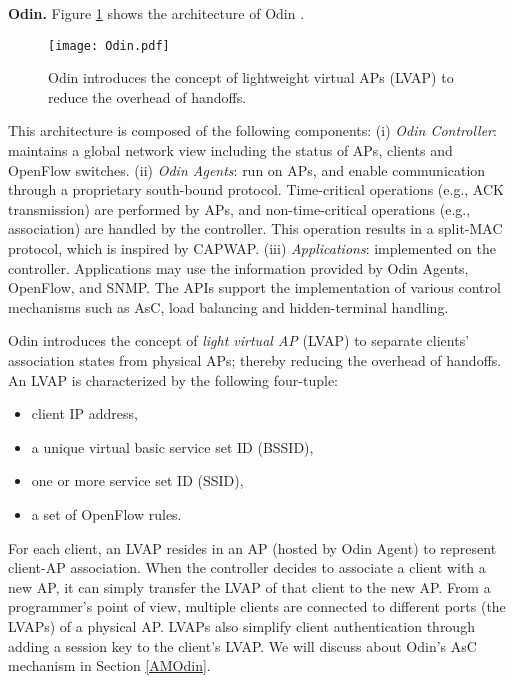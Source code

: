 \textbf{Odin.}
\label{Odin_arch}
Figure \ref{fig_Odin} shows the architecture of Odin \cite{Odin,Odin2,OdinThor,OdinSource}.
%
\begin{figure}[!t]
	\centering
	\texttt{[image: Odin.pdf]}
	\caption{Odin \cite{Odin2} introduces the concept of lightweight virtual APs (LVAP) to reduce the overhead of handoffs.}
	\label{fig_Odin}
\end{figure}
%
This architecture is composed of the following components: 
(i) \textit{Odin Controller}: maintains a global network view including the status of APs, clients and OpenFlow switches.
(ii) \textit{Odin Agents}: run on APs, and enable communication through a proprietary south-bound protocol. Time-critical operations (e.g., ACK transmission) are performed by APs, and non-time-critical operations (e.g., association) are handled by the controller.
This operation results in a split-MAC protocol, which is inspired by CAPWAP. 
(iii) \textit{Applications}: implemented on the controller. Applications may use the information provided by Odin Agents, OpenFlow, and SNMP.
The APIs  support the implementation of various control mechanisms such as AsC, load balancing and hidden-terminal handling.

%
Odin introduces the concept of \textit{light virtual AP} (LVAP) to separate clients' association states from physical APs; thereby reducing the overhead of handoffs.
An LVAP is characterized by the following four-tuple: 
\begin{itemize}
	\item client IP address,
	\item a unique virtual basic service set ID (BSSID),
	\item one or more service set ID (SSID),
	\item a set of OpenFlow rules.
\end{itemize}

For each client, an LVAP resides in an AP (hosted by Odin Agent) to represent client-AP association. 
When the controller decides to associate a client with a new AP, it can simply transfer the LVAP of that client to the new AP. 
From a programmer's point of view, multiple clients are connected to different ports (the LVAPs) of a physical AP. 
LVAPs also simplify client authentication through adding a session key to the client's LVAP.
We will discuss about Odin's AsC mechanism in Section \ref{AMOdin}.


